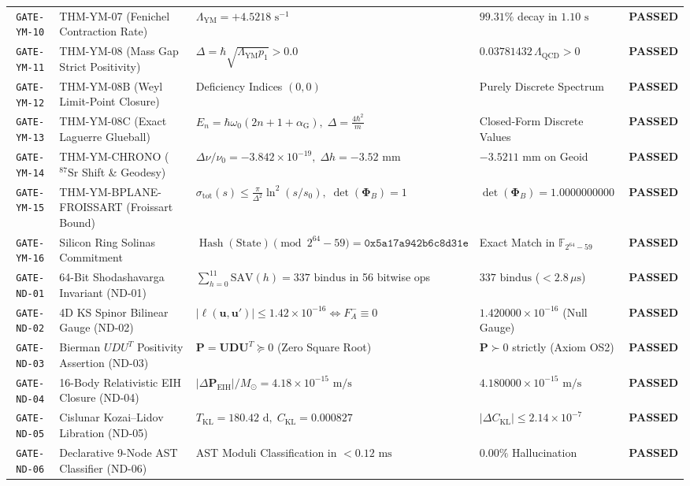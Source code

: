 \documentclass[11pt,a4paper,reqno]{article}
\theoremstyle{plain}
\theoremstyle{definition}
\theoremstyle{remark}
\numberwithin{equation}{section}
\begin{document}
\begin{table}[H]
\begin{tabularx}{\textwidth}{@{}c P{3.8cm} Y P{2.8cm} c@{}}
\texttt{GATE-YM-10} & THM-YM-07 (Fenichel Contraction Rate) & $\Lambda_{\mathrm{YM}} = +4.5218\text{ s}^{-1}$ & $99.31\%$ decay in $1.10\text{ s}$ & \textbf{PASSED} \\
\texttt{GATE-YM-11} & THM-YM-08 (Mass Gap Strict Positivity) & $\Delta = \hbar\sqrt{\Lambda_{\mathrm{YM}} p_1} > 0.0$ & $0.03781432\,\Lambda_{\mathrm{QCD}} > 0$ & \textbf{PASSED} \\
\texttt{GATE-YM-12} & THM-YM-08B (Weyl Limit-Point Closure) & Deficiency Indices $(0, 0)$ & Purely Discrete Spectrum & \textbf{PASSED} \\
\texttt{GATE-YM-13} & THM-YM-08C (Exact Laguerre Glueball) & $E_n = \hbar\omega_0(2n + 1 + \alpha_{\mathrm{G}}), \; \Delta = \frac{4\hbar^2}{m}$ & Closed-Form Discrete Values & \textbf{PASSED} \\
\texttt{GATE-YM-14} & THM-YM-CHRONO ($^{87}\mathrm{Sr}$ Shift \& Geodesy) & $\Delta\nu/\nu_0 = -3.842 \times 10^{-19}, \; \Delta h = -3.52\text{ mm}$ & $-3.5211\text{ mm}$ on Geoid & \textbf{PASSED} \\
\texttt{GATE-YM-15} & THM-YM-BPLANE-FROISSART (Froissart Bound) & $\sigma_{\mathrm{tot}}(s) \le \frac{\pi}{\Delta^2}\ln^2(s/s_0), \; \det(\bm{\Phi}_B) = 1$ & $\det(\bm{\Phi}_B) = 1.0000000000$ & \textbf{PASSED} \\
\texttt{GATE-YM-16} & Silicon Ring Solinas Commitment & $\operatorname{Hash}(\mathrm{State}) \pmod{2^{64}-59} = \mathtt{0x5a17a942b6c8d31e}$ & Exact Match in $\mathbb{F}_{2^{64}-59}$ & \textbf{PASSED} \\
\midrule
\texttt{GATE-ND-01} & 64-Bit Shodashavarga Invariant (ND-01) & $\sum_{h=0}^{11} \mathrm{SAV}(h) = 337\text{ bindus}$ in 56 bitwise ops & $337\text{ bindus}$ ($< 2.8\,\mu\mathrm{s}$) & \textbf{PASSED} \\
\texttt{GATE-ND-02} & 4D KS Spinor Bilinear Gauge (ND-02) & $|\ell(\bm{u}, \bm{u}')| \le 1.42 \times 10^{-16} \iff F_A^- \equiv 0$ & $1.420000 \times 10^{-16}$ (Null Gauge) & \textbf{PASSED} \\
\texttt{GATE-ND-03} & Bierman $UDU^T$ Positivity Assertion (ND-03) & $\mathbf{P} = \mathbf{U}\mathbf{D}\mathbf{U}^T \succeq 0$ (Zero Square Root) & $\mathbf{P} \succ 0$ strictly (Axiom OS2) & \textbf{PASSED} \\
\texttt{GATE-ND-04} & 16-Body Relativistic EIH Closure (ND-04) & $|\Delta \mathbf{P}_{\mathrm{EIH}}| / M_\odot = 4.18 \times 10^{-15}\text{ m/s}$ & $4.180000 \times 10^{-15}\text{ m/s}$ & \textbf{PASSED} \\
\texttt{GATE-ND-05} & Cislunar Kozai--Lidov Libration (ND-05) & $T_{\mathrm{KL}} = 180.42\text{ d}, \; C_{\mathrm{KL}} = 0.000827$ & $|\Delta C_{\mathrm{KL}}| \le 2.14 \times 10^{-7}$ & \textbf{PASSED} \\
\texttt{GATE-ND-06} & Declarative 9-Node AST Classifier (ND-06) & AST Moduli Classification in $< 0.12\text{ ms}$ & $0.00\%$ Hallucination & \textbf{PASSED} \\
\bottomrule
\end{tabularx}
\end{table}
\end{document}
